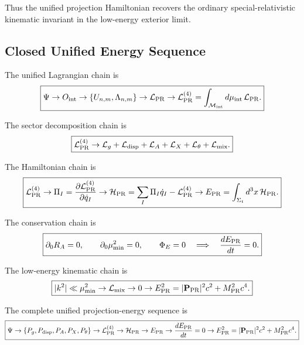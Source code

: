 \documentclass[11pt]{article}
\begin{document}
Thus the unified projection Hamiltonian recovers the ordinary special-relativistic
kinematic invariant in the low-energy exterior limit.

\subsection{Closed Unified Energy Sequence}

The unified Lagrangian chain is
\begin{equation}
\boxed{
\Psi
\rightarrow
O_{\rm int}
\rightarrow
\{U_{n,m},\Lambda_{n,m}\}
\rightarrow
\mathcal L_{\rm PR}
\rightarrow
\mathcal L_{\rm PR}^{(4)}
=
\int_{\mathcal M_{\rm int}}
d\mu_{\rm int}\,
\mathcal L_{\rm PR}.
}
\end{equation}

The sector decomposition chain is
\begin{equation}
\boxed{
\mathcal L_{\rm PR}^{(4)}
\rightarrow
\mathcal L_g
+
\mathcal L_{\rm disp}
+
\mathcal L_A
+
\mathcal L_X
+
\mathcal L_\theta
+
\mathcal L_{\rm mix}.
}
\end{equation}

The Hamiltonian chain is
\begin{equation}
\boxed{
\mathcal L_{\rm PR}^{(4)}
\rightarrow
\Pi_I
=
\frac{\partial\mathcal L_{\rm PR}^{(4)}}{\partial\dot q_I}
\rightarrow
\mathcal H_{\rm PR}
=
\sum_I\Pi_I\dot q_I-\mathcal L_{\rm PR}^{(4)}
\rightarrow
E_{\rm PR}
=
\int_{\Sigma_t}
d^3x\,\mathcal H_{\rm PR}.
}
\end{equation}

The conservation chain is
\begin{equation}
\boxed{
\partial_0R_A=0,
\qquad
\partial_0\mu_{\min}^2=0,
\qquad
\Phi_E=0
\quad
\Longrightarrow
\quad
\frac{dE_{\rm PR}}{dt}=0.
}
\end{equation}

The low-energy kinematic chain is
\begin{equation}
\boxed{
|k^2|\ll\mu_{\min}^2
\rightarrow
\mathcal L_{\rm mix}\rightarrow0
\rightarrow
E_{\rm PR}^2
=
|\mathbf P_{\rm PR}|^2c^2
+
M_{\rm PR}^2c^4.
}
\end{equation}

The complete unified projection-energy sequence is
\begin{equation}
\boxed{
\Psi
\rightarrow
\{P_g,P_{\rm disp},P_A,P_X,P_\theta\}
\rightarrow
\mathcal L_{\rm PR}^{(4)}
\rightarrow
\mathcal H_{\rm PR}
\rightarrow
E_{\rm PR}
\rightarrow
\frac{dE_{\rm PR}}{dt}=0
\rightarrow
E_{\rm PR}^2
=
|\mathbf P_{\rm PR}|^2c^2
+
M_{\rm PR}^2c^4.
}
\end{equation}
\end{document}
